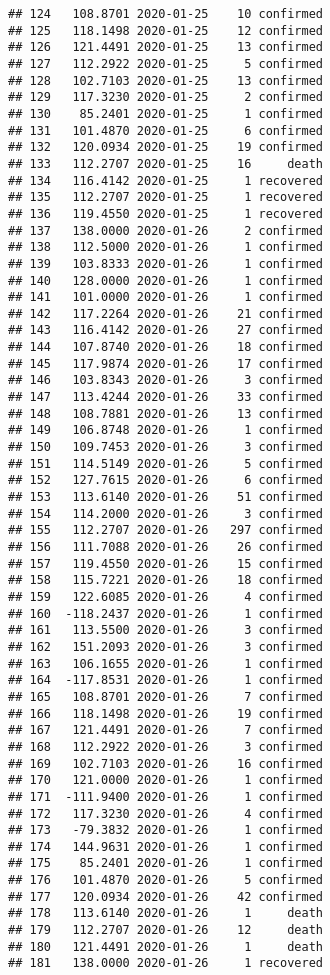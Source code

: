 \documentclass[
]{article}
\begin{document}
\begin{verbatim}
## 124   108.8701 2020-01-25    10 confirmed
## 125   118.1498 2020-01-25    12 confirmed
## 126   121.4491 2020-01-25    13 confirmed
## 127   112.2922 2020-01-25     5 confirmed
## 128   102.7103 2020-01-25    13 confirmed
## 129   117.3230 2020-01-25     2 confirmed
## 130    85.2401 2020-01-25     1 confirmed
## 131   101.4870 2020-01-25     6 confirmed
## 132   120.0934 2020-01-25    19 confirmed
## 133   112.2707 2020-01-25    16     death
## 134   116.4142 2020-01-25     1 recovered
## 135   112.2707 2020-01-25     1 recovered
## 136   119.4550 2020-01-25     1 recovered
## 137   138.0000 2020-01-26     2 confirmed
## 138   112.5000 2020-01-26     1 confirmed
## 139   103.8333 2020-01-26     1 confirmed
## 140   128.0000 2020-01-26     1 confirmed
## 141   101.0000 2020-01-26     1 confirmed
## 142   117.2264 2020-01-26    21 confirmed
## 143   116.4142 2020-01-26    27 confirmed
## 144   107.8740 2020-01-26    18 confirmed
## 145   117.9874 2020-01-26    17 confirmed
## 146   103.8343 2020-01-26     3 confirmed
## 147   113.4244 2020-01-26    33 confirmed
## 148   108.7881 2020-01-26    13 confirmed
## 149   106.8748 2020-01-26     1 confirmed
## 150   109.7453 2020-01-26     3 confirmed
## 151   114.5149 2020-01-26     5 confirmed
## 152   127.7615 2020-01-26     6 confirmed
## 153   113.6140 2020-01-26    51 confirmed
## 154   114.2000 2020-01-26     3 confirmed
## 155   112.2707 2020-01-26   297 confirmed
## 156   111.7088 2020-01-26    26 confirmed
## 157   119.4550 2020-01-26    15 confirmed
## 158   115.7221 2020-01-26    18 confirmed
## 159   122.6085 2020-01-26     4 confirmed
## 160  -118.2437 2020-01-26     1 confirmed
## 161   113.5500 2020-01-26     3 confirmed
## 162   151.2093 2020-01-26     3 confirmed
## 163   106.1655 2020-01-26     1 confirmed
## 164  -117.8531 2020-01-26     1 confirmed
## 165   108.8701 2020-01-26     7 confirmed
## 166   118.1498 2020-01-26    19 confirmed
## 167   121.4491 2020-01-26     7 confirmed
## 168   112.2922 2020-01-26     3 confirmed
## 169   102.7103 2020-01-26    16 confirmed
## 170   121.0000 2020-01-26     1 confirmed
## 171  -111.9400 2020-01-26     1 confirmed
## 172   117.3230 2020-01-26     4 confirmed
## 173   -79.3832 2020-01-26     1 confirmed
## 174   144.9631 2020-01-26     1 confirmed
## 175    85.2401 2020-01-26     1 confirmed
## 176   101.4870 2020-01-26     5 confirmed
## 177   120.0934 2020-01-26    42 confirmed
## 178   113.6140 2020-01-26     1     death
## 179   112.2707 2020-01-26    12     death
## 180   121.4491 2020-01-26     1     death
## 181   138.0000 2020-01-26     1 recovered

\end{verbatim}
\end{document}
